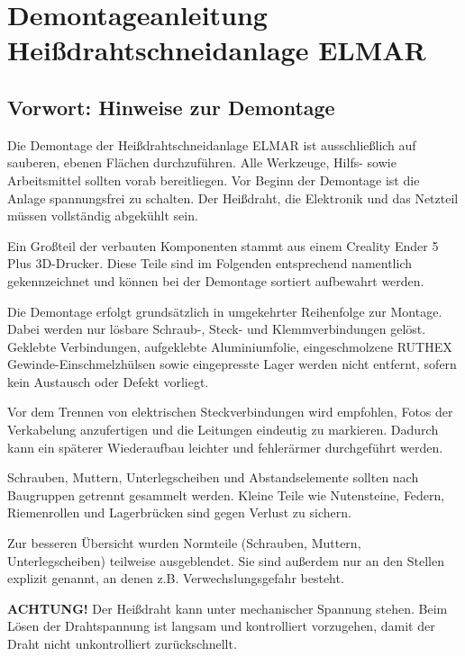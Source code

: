 %
%

\chapter{Demontageanleitung Heißdrahtschneidanlage \glqq ELMAR\grqq}


\section{Vorwort: Hinweise zur Demontage}

Die Demontage der Heißdrahtschneidanlage \glqq ELMAR\grqq{} ist ausschließlich auf sauberen, ebenen Flächen durchzuführen. Alle Werkzeuge, Hilfs- sowie Arbeitsmittel sollten vorab bereitliegen. Vor Beginn der Demontage ist die Anlage spannungsfrei zu schalten. Der Heißdraht, die Elektronik und das Netzteil müssen vollständig abgekühlt sein.

Ein Großteil der verbauten Komponenten stammt aus einem Creality Ender 5 Plus 3D-Drucker. Diese Teile sind im Folgenden entsprechend namentlich gekennzeichnet und können bei der Demontage sortiert aufbewahrt werden.

Die Demontage erfolgt grundsätzlich in umgekehrter Reihenfolge zur Montage. Dabei werden nur lösbare Schraub-, Steck- und Klemmverbindungen gelöst. Geklebte Verbindungen, aufgeklebte Aluminiumfolie, eingeschmolzene RUTHEX Gewinde-Einschmelzhülsen sowie eingepresste Lager werden nicht entfernt, sofern kein Austausch oder Defekt vorliegt.

Vor dem Trennen von elektrischen Steckverbindungen wird empfohlen, Fotos der Verkabelung anzufertigen und die Leitungen eindeutig zu markieren. Dadurch kann ein späterer Wiederaufbau leichter und fehlerärmer durchgeführt werden.

Schrauben, Muttern, Unterlegscheiben und Abstandselemente sollten nach Baugruppen getrennt gesammelt werden. Kleine Teile wie Nutensteine, Federn, Riemenrollen und Lagerbrücken sind gegen Verlust zu sichern.

Zur besseren Übersicht wurden Normteile (Schrauben, Muttern, Unterlegscheiben) teilweise ausgeblendet. Sie sind außerdem nur an den Stellen explizit genannt, an denen z.B. Verwechslungsgefahr besteht.

\textbf{ACHTUNG!} Der Heißdraht kann unter mechanischer Spannung stehen. Beim Lösen der Drahtspannung ist langsam und kontrolliert vorzugehen, damit der Draht nicht unkontrolliert zurückschnellt.

